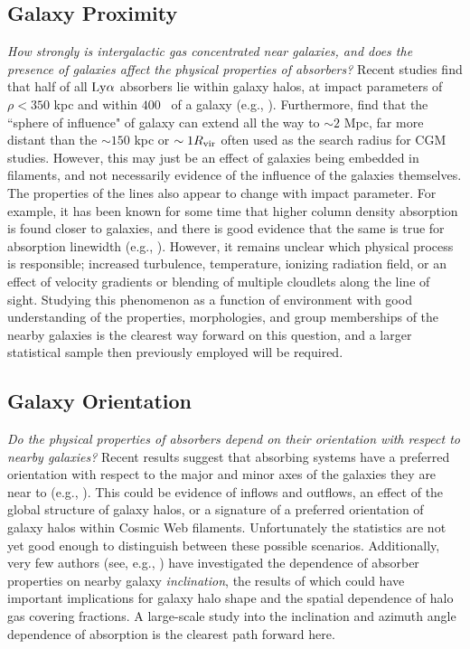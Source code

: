 \subsection{Galaxy Proximity}
\emph{How strongly is intergalactic gas concentrated near galaxies, and does the presence of galaxies affect the physical properties of absorbers?} Recent studies find that half of all $\rm Ly\alpha$ absorbers lie within galaxy halos, at impact parameters of $\rho <350$ kpc and within $400$ \kms~of a galaxy (e.g., \citealt{cote2005, prochaska2006, wakker2009}). Furthermore, \cite{sorini2018} find that the ``sphere of influence" of galaxy can extend all the way to $\sim 2$ Mpc, far more distant than the $\sim150$ kpc or $\sim 1 R_{\rm vir}$ often used as the search radius for CGM studies. However, this may just be an effect of galaxies being embedded in filaments, and not necessarily evidence of the influence of the galaxies themselves. The properties of the lines also appear to change with impact parameter. For example, it has been known for some time that higher column density absorption is found closer to galaxies, and there is good evidence that the same is true for absorption linewidth (e.g., \citealt{wakker2009, prochaska2011b}). However, it remains unclear which physical process is responsible; increased turbulence, temperature, ionizing radiation field, or an effect of velocity gradients or blending of multiple cloudlets along the line of sight. Studying this phenomenon as a function of environment with good understanding of the properties, morphologies, and group memberships of the nearby galaxies is the clearest way forward on this question, and a larger statistical sample then previously employed will be required.


\subsection{Galaxy Orientation}
\emph{Do the physical properties of absorbers depend on their orientation with respect to nearby galaxies?} Recent results suggest that absorbing systems have a preferred orientation with respect to the major and minor axes of the galaxies they are near to (e.g., \citealt{kacprzak2011_inclination, kacprzak2012}). This could be evidence of inflows and outflows, an effect of the global structure of galaxy halos, or a signature of a preferred orientation of galaxy halos within Cosmic Web filaments. Unfortunately the statistics are not yet good enough to distinguish between these possible scenarios. Additionally, very few authors (see, e.g., \citealt{mathes2014, bordoloi2014}) have investigated the dependence of absorber properties on nearby galaxy \emph{inclination}, the results of which could have important implications for galaxy halo shape and the spatial dependence of halo gas covering fractions. A large-scale study into the inclination and azimuth angle dependence of absorption is the clearest path forward here.

